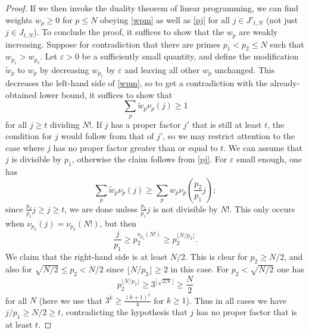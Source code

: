 \documentclass[10pt,a4paper,reqno]{amsart}
\numberwithin{equation}{section}
\theoremstyle{plain}
\theoremstyle{definition}
\newcommand\eps{\varepsilon}
\begin{document}
\begin{proof}
If we then invoke the duality theorem of linear programming, we can find weights $w_p \geq 0$ for $p \leq N$ obeying \eqref{wpm} as well as \eqref{pj} for all $j \in J'_{t,N}$ (not just $j \in J_{t,N}$).  To conclude the proof, it suffices to show that the $w_p$ are weakly increasing. Suppose for contradiction that there are primes $p_1 < p_2 \leq N$ such that $w_{p_1} > w_{p_2}$.  Let $\eps>0$ be a sufficiently small quantity, and define the modification $\tilde w_p$ to $w_p$ by decreasing $w_{p_1}$ by $\eps$ and leaving all other $w_p$ unchanged.  This decreases the left-hand side of \eqref{wpm}, so to get a contradiction with the already-obtained lower bound, it suffices to show that
  $$ \sum_p \tilde w_p \nu_p(j) \geq 1$$
  for all $j \geq t$ dividing $N!$.  If $j$ has a proper factor $j'$ that is still at least $t$, the condition for $j$ would follow from that of $j'$, so we may restrict attention to the case where $j$ has no proper factor greater than or equal to $t$.  We can assume that $j$ is divisible by $p_1$, otherwise the claim follows from \eqref{pj}.  For $\eps$ small enough, one has
  $$ \sum_p \tilde w_p \nu_p(j) \geq \sum_p w_p \nu_p\left(\frac{p_2}{p_1} j\right);$$
since $\frac{p_2}{p_1} j \geq j \geq t$, we are done unless $\frac{p_2}{p_1} j$ is not divisible by $N!$. This only occurs when $\nu_{p_2}(j) = \nu_{p_2}(N!)$, but then
$$ \frac{j}{p_1} \geq p_2^{\nu_{p_2}(N!)} \geq p_2^{\lfloor N/p_2\rfloor}.$$
We claim that the right-hand side is at least $N/2$.  This is clear for $p_2 \geq N/2$, and also for $\sqrt{N/2} \leq p_2 < N/2$ since $\lfloor N/p_2\rfloor \geq 2$ in this case.  For $p_2 < \sqrt{N/2}$ one has 
$$  p_2^{\lfloor N/p_2\rfloor} \geq 3^{\lfloor \sqrt{2N} \rfloor} \geq \frac{N}{2}$$
for all $N$ (here we use that $3^k \geq \frac{(k+1)^2}{4}$ for $k \geq 1$).  Thus in all cases we have $j/p_1 \geq N/2 \geq t$, contradicting the hypothesis that $j$ has no proper factor that is at least $t$.
\end{proof}
\end{document}
